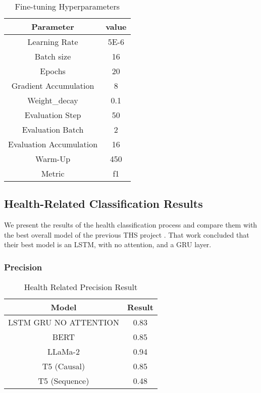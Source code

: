 \begin{table}[H]
	\centering
	\caption{Fine-tuning Hyperparameters}
	{\small
	\begin{tabular}{||c | c||} 
		\hline
		\textbf{Parameter} & \textbf{value} \\ 
		\hline
		Learning Rate & 5E-6  \\
		\hline
		Batch size & 16  \\
		\hline
		Epochs & 20 \\
		\hline
		Gradient Accumulation & 8 \\
		\hline
		Weight\_decay & 0.1 \\
		\hline
		Evaluation Step & 50 \\
		\hline
		Evaluation Batch & 2 \\
		\hline
		Evaluation Accumulation & 16 \\
		\hline
		Warm-Up & 450 \\
		\hline
		Metric & f1 \\
		\hline
	\end{tabular}
	}
	\label{table:hyperparameters}
\end{table}

\subsection{Health-Related Classification Results}
We present the results of the health classification process and compare them with the best overall model of the previous THS project \cite{8622504}. That work concluded
that their best model is an LSTM, with no attention, and a GRU layer.

\subsubsection{Precision}
\begin{table}[H]
	\centering
	\caption{Health Related Precision Result}
	{\small
	\begin{tabular}{||c | c||} 
		\hline
		\textbf{Model} & \textbf{Result} \\ 
		\hline
		LSTM GRU NO ATTENTION & 0.83  \\
		\hline		
		BERT & 0.85  \\
		\hline
		LLaMa-2 & 0.94 \\ 
		\hline
		T5 (Causal) & 0.85 \\
		\hline
		T5 (Sequence) & 0.48 \\
		\hline
	\end{tabular}
	}
	\label{table:HealthPrecision}
\end{table}

